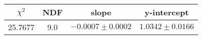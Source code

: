 \begin{tabular}{|c|c|c|c|}

\hline
$\chi^{2}$ & NDF & slope & y-intercept  \\
\hline
25.7677 & 9.0 & $-0.0007\pm0.0002$ & $1.0342\pm0.0166$ \\
\hline

\end{tabular}
